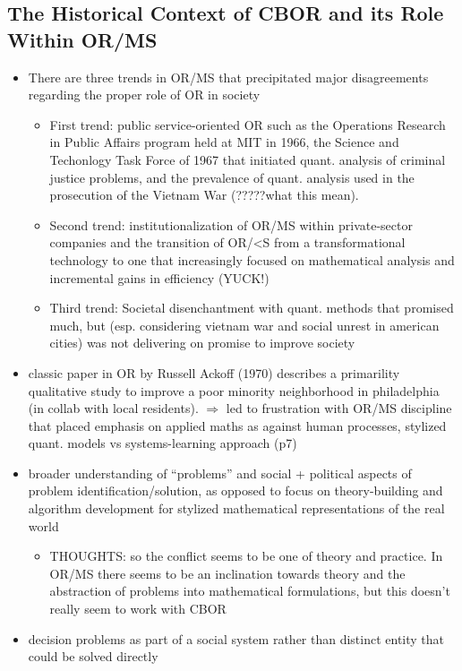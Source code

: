 \documentclass{article}
\begin{document}
\subsection{The Historical Context of CBOR and its Role Within OR/MS}
\begin{itemize}
\item There are three trends in OR/MS that precipitated major disagreements regarding the proper role of OR in society
	\begin{itemize}
	\item First trend: public service-oriented OR such as the Operations Research in Public Affairs program held at MIT in 1966, the Science and Techonlogy Task Force of 1967 that initiated quant. analysis of criminal justice problems, and the prevalence of quant. analysis used in the prosecution of the Vietnam War (?????what this mean).
    \item Second trend: institutionalization of OR/MS within private-sector companies and the transition of OR/<S from a transformational technology to one that increasingly focused on mathematical analysis and incremental gains in efficiency (YUCK!)
    \item Third trend: Societal disenchantment with quant. methods that promised much, but (esp. considering vietnam war and social unrest in american cities) was not delivering on promise to improve society
	\end{itemize}
\item classic paper in OR by Russell Ackoff (1970) describes a primarility qualitative study to improve a poor minority neighborhood in philadelphia (in collab with local residents). $\Rightarrow$ led to frustration with OR/MS discipline that placed emphasis on applied maths as against human processes, stylized quant. models vs systems-learning approach (p7)
\item broader understanding of ``problems'' and social + political aspects of problem identification/solution, as opposed to focus on theory-building and algorithm development for stylized mathematical representations of the real world
	\begin{itemize}
	\item THOUGHTS: so the conflict seems to be one of theory and practice. In OR/MS there seems to be an inclination towards theory and the abstraction of problems into mathematical formulations, but this doesn't really seem to work with CBOR
	\end{itemize}
\item decision problems as part of a social system rather than distinct entity that could be solved directly

\end{itemize}
\end{document}
